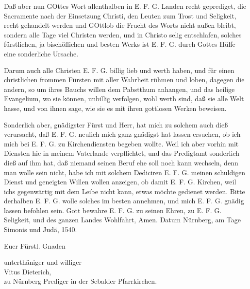 Daß aber nun GOttes Wort allenthalben in E. F. G. Landen recht geprediget, die Sacramente nach der Einsetzung Christi, den Leuten zum Trost und Seligkeit, recht gehandelt werden und GOttlob die Frucht des Worts nicht außen bleibt, sondern alle Tage viel Christen werden, und in Christo selig entschlafen, solches fürstlichen, ja bischöflichen und besten Werks ist E. F. G. durch Gottes Hülfe eine sonderliche Ursache.

Darum auch alle Christen E. F. G. billig lieb und werth haben, und für einen christlichen frommen Fürsten mit aller Wahrheit rühmen und loben, dagegen die andern, so um ihres Bauchs willen dem Pabstthum anhangen, und das heilige Evangelium, wo sie können, unbillig verfolgen, wohl werth sind, daß sie alle Welt hasse, und von ihnen sage, wie sie es mit ihren gottlosen Werken beweisen.

Sonderlich aber, gnädigster Fürst und Herr, hat mich zu solchem auch dieß verursacht, daß E. F. G. neulich mich ganz gnädigst hat lassen ersuchen, ob ich mich bei E. F. G. zu Kirchendiensten begeben wollte. Weil ich aber vorhin mit Diensten hie in meinem Vaterlande verpflichtet, und das Predigtamt sonderlich dieß auf ihm hat, daß niemand seinen Beruf ehe soll noch kann wechseln, denn man wolle sein nicht, habe ich mit solchem Dediciren E. F. G. meinen schuldigen Dienst und geneigten Willen wollen anzeigen, ob damit E. F. G. Kirchen, weil ichs gegenwärtig mit dem Leibe nicht kann, etwas möchte gedienet werden. Bitte derhalben E. F. G. wolle solches im besten annehmen, und mich E. F. G. gnädig lassen befohlen sein. Gott bewahre E. F. G. zu seinen Ehren, zu E. F. G. Seligkeit, und des ganzen Landes Wohlfahrt, Amen. Datum Nürnberg, am Tage Simonis und Judä, 1540.

Euer Fürstl. Gnaden

\begin{unterschrift}

unterthäniger und williger\\Vitus Dieterich,\\zu Nürnberg Prediger in der Sebalder Pfarrkirchen.

\end{unterschrift}


